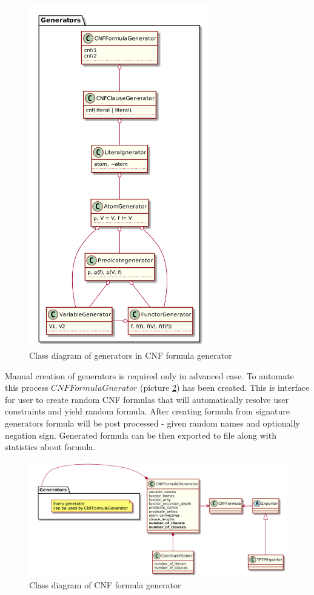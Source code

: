 \begin{figure}[h]
\begin{centering}
  \includegraphics[width=0.7\textwidth]{logic-formula-generator/fol/cnf_signature_generators.png}
  \caption{Class diagram of generators in CNF formula generator}
  \label{pic:fol_signature_generator_class_diagram}
\end{centering}
\end{figure}

Manual creation of generators is required only in advanced case. To automate this process $CNFFormulaGnerator$ (picture \ref{pic:cnf_generator_class_diagram}) has been created. This is interface for user to create random CNF formulas that will automatically resolve user constraints and yield random formula. After creating formula from signature generators formula will be post processed - given random names and optionally negation sign. Generated formula can be then exported to file along with statistics about formula.

\begin{figure}[h]
\begin{centering}
  \includegraphics[width=\textwidth]{logic-formula-generator/cnf_formula_generator.png}
  \caption{Class diagram of CNF formula generator}
  \label{pic:cnf_generator_class_diagram}
\end{centering}
\end{figure}


